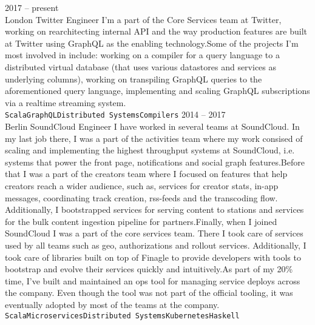 \documentclass[9pt]{developercv} %
\begin{document}
\begin{entrylist}
	\entry
		{2017 -- present\\\footnotesize{London}}
		{Twitter}
		{Engineer}
		{I'm a part of the Core Services team at Twitter, working on rearchitecting internal API and the way production features are built at Twitter using GraphQL as the enabling technology.\newline\newline Some of the projects I'm most involved in include: working on a compiler for a query language to a distributed virtual database (that uses various datastores and services as underlying columns), working on transpiling GraphQL queries to the aforementioned query language, implementing and scaling GraphQL subscriptions via a realtime streaming system.\\ \texttt{Scala}\slashsep\texttt{GraphQL}\slashsep\texttt{Distributed Systems}\slashsep\texttt{Compilers}}
	\entry
		{2014 -- 2017\\\footnotesize{Berlin}}
		{SoundCloud}
		{Engineer}
		{I have worked in several teams at SoundCloud. In my last job there, I was a part of the activities team where my work consised of scaling and implementing the highest throughput systems at SoundCloud, i.e. systems that power the front page, notifications and social graph features.\newline\newline Before that I was a part of the creators team where I focused on features that help creators reach a wider audience, such as, services for creator stats, in-app messages, coordinating track creation, rss-feeds and the transcoding flow. Additionally, I bootstrapped services for serving content to stations and services for the bulk content ingestion pipeline for partners.\newline\newline Finally, when I joined SoundCloud I was a part of the core services team. There I took care of services used by all teams such as geo, authorizations and rollout services. Additionally, I took care of libraries built on top of Finagle to provide developers with tools to bootstrap and evolve their services quickly and intuitively.\newline\newline As part of my 20\% time, I've built and maintained an ops tool for managing service deploys across the company. Even though the tool was not part of the official tooling, it was eventually adopted by most of the teams at the company.\\ \texttt{Scala}\slashsep\texttt{Microservices}\slashsep\texttt{Distributed Systems}\slashsep\texttt{Kubernetes}\slashsep\texttt{Haskell}}

\end{entrylist}
\end{document}
